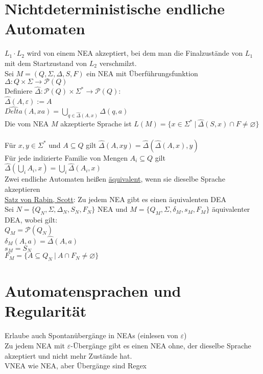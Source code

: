 \documentclass[a4paper]{article}
\newcommand{\ul}{\underline}
\let\epsilon\varepsilon
\begin{document}
\section{Nichtdeterministische endliche Automaten}
$L_1\cdot L_2$ wird von einem NEA akzeptiert, bei dem man die Finalzustände von $L_1$ mit dem Startzustand von $L_2$ verschmilzt.\\
Sei $M=(Q,\Sigma,\Delta,S,F)$ ein NEA mit Überführungsfunktion $\Delta:Q\times\Sigma\rightarrow\mathcal{P}(Q)$\\
Definiere $\hat{\Delta}:\mathcal{P}(Q)\times\Sigma^*\rightarrow\mathcal{P}(Q)$:\\
$\hat{\Delta}(A,\epsilon):=A$\\
$\hat{Delta}(A,xa)=\bigcup_{q\in\hat{\Delta}(A,x)}\Delta(q,a)$\\
Die vom NEA $M$ akzeptierte Sprache ist $L(M)=\{x\in\Sigma^*\ \vert\ \hat{\Delta}(S,x)\cap F\neq\varnothing\}$\\\\
Für $x,y\in\Sigma^*$ und $A\subseteq Q$ gilt $\hat{\Delta}(A,xy)=\hat{\Delta}(\hat{\Delta}(A,x),y)$\\
Für jede indizierte Familie von Mengen $A_i\subseteq Q$ gilt $\hat{\Delta}(\bigcup_iA_i,x)=\bigcup_i\hat{\Delta}(A_i,x)$\\
Zwei endliche Automaten heißen \ul{äquivalent}, wenn sie dieselbe Sprache akzeptieren\\
\ul{Satz von Rabin, Scott}: Zu jedem NEA gibt es einen äquivalenten DEA\\
Sei $N=\{Q_N,\Sigma,\Delta_N,S_N,F_N\}$ NEA und $M=\{Q_M,\Sigma,\delta_M,s_M,F_M\}$ äquivalenter DEA, wobei gilt:\\
$Q_M=\mathcal{P}(Q_N)$\\
$\delta_M(A,a)=\hat{\Delta}(A,a)$\\
$s_M=S_N$\\
$F_M=\{A\subseteq Q_N\ \vert\ A\cap F_N\neq\varnothing\}$
\section{Automatensprachen und Regularität}
Erlaube auch Spontanübergänge in NEAs (einlesen von $\epsilon$)\\
Zu jedem NEA mit $\epsilon$-Übergänge gibt es einen NEA ohne, der dieselbe Sprache akzeptiert und nicht mehr Zustände hat.\\
VNEA wie NEA, aber Übergänge sind Regex
\end{document}
